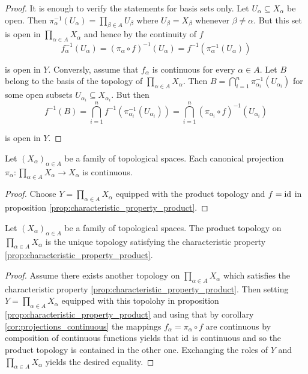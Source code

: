 \begin{proof}
	It is enough to verify the statements for basis sets only. Let $U_\alpha \subseteq X_\alpha$ be open. Then $\pi_\alpha^{-1}(U_\alpha) = \prod_{\beta \in A} U_\beta$ where $U_\beta = X_\beta$ whenever $\beta \neq \alpha$. But this set is open in $\prod_{\alpha \in A}X_\alpha$ and hence by the continuity of $f$
	\begin{equation}
		f_\alpha^{-1}(U_\alpha) = (\pi_\alpha \circ f)^{-1}(U_\alpha) = f^{-1}(\pi_\alpha^{-1}(U_\alpha))
	\end{equation}

	\noindent is open in $Y$. Conversly, assume that $f_\alpha$ is continuous for every $\alpha \in A$. Let $B$ belong to the basis of the topology of $\prod_{\alpha \in A}X_\alpha$. Then $B = \bigcap_{i = 1}^n \pi^{-1}_{\alpha_i}(U_{\alpha_i})$ for some open subsets $U_{\alpha_i} \subseteq X_{\alpha_i}$. But then 
	\begin{equation}
		f^{-1}(B) = \bigcap_{i = 1}^n f^{-1}(\pi_{\alpha_i}^{-1}(U_{\alpha_i})) = \bigcap_{i = 1}^n(\pi_{\alpha_i} \circ f)^{-1}(U_{\alpha_i})
	\end{equation}

	\noindent is open in $Y$.
\end{proof}

\begin{corollary}
	Let $(X_\alpha)_{\alpha \in A}$ be a family of topological spaces. Each canonical projection $\pi_\alpha: \prod_{\alpha \in A}X_\alpha \to X_\alpha$ is continuous.
	\label{cor:projections_continuous}
\end{corollary}

\begin{proof}
	Choose $Y = \prod_{\alpha \in A} X_\alpha$ equipped with the product topology and $f = \operatorname{id}$ in proposition \ref{prop:characteristic_property_product}. 
\end{proof}

\begin{proposition}
	Let $(X_\alpha)_{\alpha \in A}$ be a family of topological spaces. The product topology on $\prod_{\alpha \in A}X_\alpha$ is the unique topology satisfying the characteristic property \ref{prop:characteristic_property_product}.
\end{proposition}

\begin{proof}
	Assume there exists another topology on $\prod_{\alpha \in A}X_\alpha$ which satisfies the characteristic property \ref{prop:characteristic_property_product}. Then setting $Y = \prod_{\alpha \in A}X_\alpha$ equipped with this topolohy in proposition \ref{prop:characteristic_property_product} and using that by corollary \ref{cor:projections_continuous} the mappings $f_\alpha = \pi_\alpha \circ f$ are continuous by composition of continuous functions yields that $\operatorname{id}$ is continuous and so the product topology is contained in the other one. Exchanging the roles of $Y$ and $\prod_{\alpha \in A}X_\alpha$ yields the desired equality. 
\end{proof}

